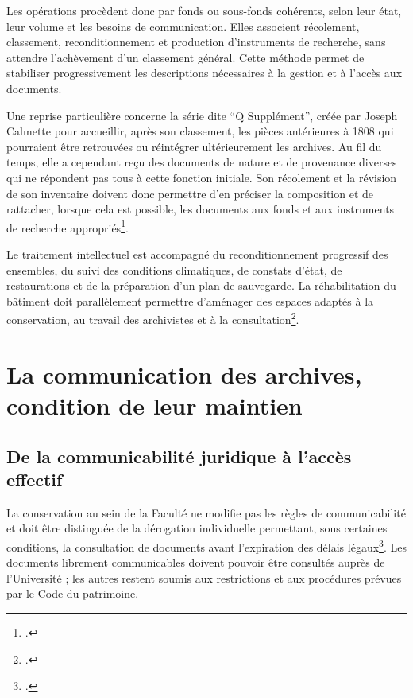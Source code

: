 Les opérations procèdent donc par fonds ou sous-fonds cohérents, selon leur état, leur volume et les besoins de communication. Elles associent récolement, classement, reconditionnement et production d'instruments de recherche, sans attendre l'achèvement d'un classement général. Cette méthode permet de stabiliser progressivement les descriptions nécessaires à la gestion et à l'accès aux documents.

Une reprise particulière concerne la série dite \enquote{Q Supplément}, créée par Joseph Calmette pour accueillir, après son classement, les pièces antérieures à 1808 qui pourraient être retrouvées ou réintégrer ultérieurement les archives. Au fil du temps, elle a cependant reçu des documents de nature et de provenance diverses qui ne répondent pas tous à cette fonction initiale. Son récolement et la révision de son inventaire doivent donc permettre d'en préciser la composition et de rattacher, lorsque cela est possible, les documents aux fonds et aux instruments de recherche appropriés\footcite{AHFMQSupplement2025}.

Le traitement intellectuel est accompagné du reconditionnement progressif des ensembles, du suivi des conditions climatiques, de constats d'état, de restaurations et de la préparation d'un plan de sauvegarde. La réhabilitation du bâtiment doit parallèlement permettre d'aménager des espaces adaptés à la conservation, au travail des archivistes et à la consultation\footcite{AHFMFeuilleRoute2025_2029}.

\section{La communication des archives, condition de leur maintien}

\subsection{De la communicabilité juridique à l'accès effectif}

La conservation au sein de la Faculté ne modifie pas les règles de communicabilité et doit être distinguée de la dérogation individuelle permettant, sous certaines conditions, la consultation de documents avant l'expiration des délais légaux\footcite[art.~L.~213-1 à L.~213-3]{CodePatrimoine}. Les documents librement communicables doivent pouvoir être consultés auprès de l'Université ; les autres restent soumis aux restrictions et aux procédures prévues par le Code du patrimoine.

